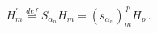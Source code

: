 \begin{equation}
   \label{weylcartan} H_m^\prime
\stackrel{def}{=}S_{\alpha_n}H_m=(s_{\alpha_n})_m^{~p}H_p\,   .
   \end{equation} 
